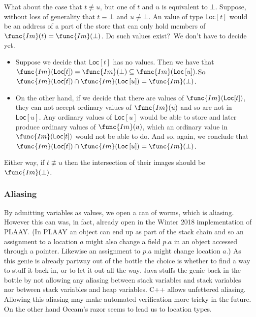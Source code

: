 \documentclass[12pt]{article}
\begin{document}
What about the case that $t\not\equiv u$, but one of $t$ and $u$ is
equivalent to $\bot $. Suppose, without loss of generality that $t\equiv
\bot $ and $u\not\equiv \bot $. An value of type $\mathsf{Loc}[t]$ would be
an address of a part of the store that can only hold members of $\func{Im}%
(t)=\func{Im}(\bot )$. Do such values exist?\ We don't have to decide yet. 

\begin{itemize}
\item Suppose we decide that $\mathsf{Loc}[t]$ has no values. Then we have
that $\func{Im}(\mathsf{Loc}[t])=\func{Im}(\bot )\subseteq \func{Im}(\mathsf{%
Loc}\left[ u\right] ).$So $\func{Im}(\mathsf{Loc}[t])\cap \func{Im}(\mathsf{%
Loc}\left[ u\right] )=\func{Im}(\bot )$.

\item On the other hand, if we decide that there are values of $\func{Im}(%
\mathsf{Loc}[t])$, they can not accept ordinary values of $\func{Im}(u)$ and
so are not in $\mathsf{Loc}\left[ u\right] $. Any ordinary values of $%
\mathsf{Loc}\left[ u\right] $ would be able to store and later produce
ordinary values of $\func{Im}(u)$, which an ordinary value in $\func{Im}(%
\mathsf{Loc}[t])$ would not be able to do. And so, again, we conclude that $%
\func{Im}(\mathsf{Loc}[t])\cap \func{Im}(\mathsf{Loc}\left[ u\right] )=\func{%
Im}(\bot )$.
\end{itemize}

Either way, if $t\not\equiv u$ then the intersection of their images should
be $\func{Im}(\bot )$.

\subsubsection{Aliasing}

By admitting variables as values, we open a can of worms, which is aliasing.
However this can was, in fact, already open in the Winter 2018
implementation of PLAAY. (In PLAAY an object can end up as part of the stack
chain and so an assignment to a location $a$ might also change a field $p.a$
in an object accessed through a pointer. Likewise an assignment to $p.a$
might change location $a$.) As this genie is already partway out of the
bottle the choice is whether to find a way to stuff it back in, or to let it
out all the way. Java stuffs the genie back in the bottle by not allowing
any aliasing between stack variables and stack variables nor between stack
variables and heap variables. C++ allows unfettered aliasing. Allowing this
aliasing may make automated verification more tricky in the future. On the
other hand Occam's razor seems to lead us to location types.
\end{document}
